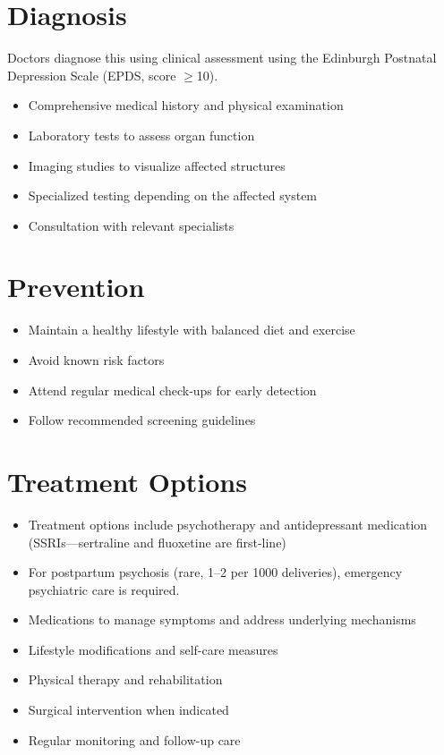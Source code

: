 \section{Diagnosis}
Doctors diagnose this using clinical assessment using the Edinburgh Postnatal Depression Scale (EPDS, score $\ge$10).

\begin{itemize}[noitemsep]
  \item Comprehensive medical history and physical examination
  \item Laboratory tests to assess organ function
  \item Imaging studies to visualize affected structures
  \item Specialized testing depending on the affected system
  \item Consultation with relevant specialists
\end{itemize}
\section{Prevention}
\begin{itemize}[noitemsep]
  \item Maintain a healthy lifestyle with balanced diet and exercise
  \item Avoid known risk factors
  \item Attend regular medical check-ups for early detection
  \item Follow recommended screening guidelines
\end{itemize}
\section{Treatment Options}
\begin{itemize}[noitemsep]
  \item Treatment options include psychotherapy and antidepressant medication (SSRIs---sertraline and fluoxetine are first-line)
  \item For postpartum psychosis (rare, 1--2 per 1000 deliveries), emergency psychiatric care is required.
  \item Medications to manage symptoms and address underlying mechanisms
  \item Lifestyle modifications and self-care measures
  \item Physical therapy and rehabilitation
  \item Surgical intervention when indicated
  \item Regular monitoring and follow-up care
\end{itemize}
